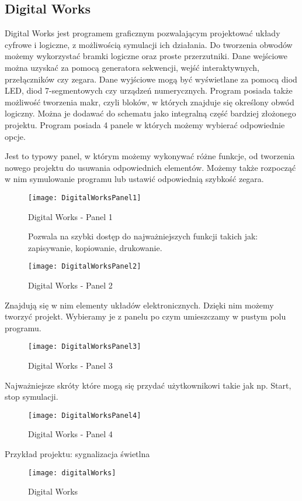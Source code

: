 \documentclass[12pt, a4paper, onside, polish]{article}				%
\begin{document}
\subsection{Digital Works}
\hspace{\parindent}
Digital Works jest programem graficznym pozwalającym projektować układy cyfrowe i logiczne, z możliwością symulacji ich działania. Do tworzenia obwodów możemy wykorzystać bramki logiczne oraz proste przerzutniki. Dane wejściowe można uzyskać za pomocą generatora sekwencji, wejść interaktywnych, przełączników czy zegara. Dane wyjściowe mogą być wyświetlane za pomocą diod LED, diod 7-segmentowych czy urządzeń numerycznych. Program posiada także możliwość tworzenia makr, czyli bloków, w których znajduje się określony obwód logiczny. Można je dodawać do schematu jako integralną część bardziej złożonego projektu.  \newline\newline
Program posiada 4 panele w których możemy wybierać odpowiednie opcje.
 \begin{enumerate}
\item Jest to typowy panel, w którym możemy wykonywać różne funkcje, od tworzenia nowego projektu do usuwania odpowiednich elementów. Możemy także rozpocząć w nim symulowanie programu lub ustawić odpowiednią szybkość zegara. 
  	\begin{figure}[hbt!]
  	  {\centering \texttt{[image: DigitalWorksPanel1]} \caption{Digital Works - Panel 1}}\vspace{5mm}
    	
\item Pozwala na szybki dostęp do najważniejszych funkcji takich jak: zapisywanie, kopiowanie, drukowanie.
  	  {\centering \texttt{[image: DigitalWorksPanel2]} \caption{Digital Works - Panel 2}}\vspace{5mm}
    	\end{figure}

\item Znajdują się w nim elementy układów elektronicznych. Dzięki nim możemy tworzyć projekt. Wybieramy je z panelu po czym umieszczamy w pustym polu programu. 
   	\begin{figure}[hbt!]
  	  {\centering \texttt{[image: DigitalWorksPanel3]} \caption{Digital Works - Panel 3}}\vspace{5mm}
    	\end{figure}

\item Najważniejsze skróty które mogą się przydać użytkownikowi takie jak np. Start, stop symulacji. 
   	\begin{figure}[hbt!]
  	  {\centering \texttt{[image: DigitalWorksPanel4]} \caption{Digital Works - Panel 4}}\vspace{5mm}
    	\end{figure}
\end{enumerate}
Przykład projektu: sygnalizacja świetlna
\begin{figure}[hbt!]
{\centering \texttt{[image: digitalWorks]} \caption{Digital Works}}\vspace{5mm}
\end{figure}
\end{document}
